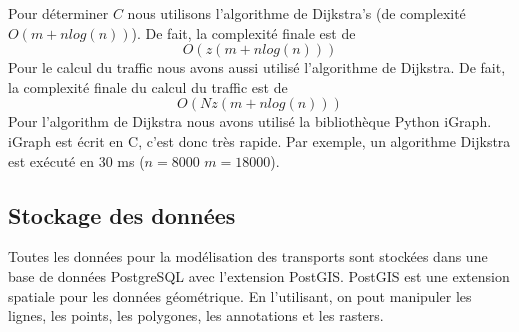 
Pour déterminer $C$ nous utilisons l'algorithme de Dijkstra's (de complexité $O(m +n log(n) )$). De fait, la complexité finale est de
$$O(z (m + n log(n)))$$
Pour le calcul du traffic nous avons aussi utilisé l'algorithme de Dijkstra. De fait, la complexité finale du calcul du traffic est de  
$$O(N z (m + n log(n)))$$
Pour l'algorithm de Dijkstra nous avons utilisé la bibliothèque Python iGraph. iGraph est écrit en C, c'est donc très rapide. Par exemple, un algorithme Dijkstra est exécuté en 30 ms ($n = 8000$ $m = 18000$).



\subsection{Stockage des données}


Toutes les données pour la modélisation des transports sont stockées dans une base de données PostgreSQL avec l'extension PostGIS. PostGIS est une extension spatiale pour les données géométrique. En l'utilisant, on pout manipuler les lignes, les points, les polygones, les annotations et les rasters.


